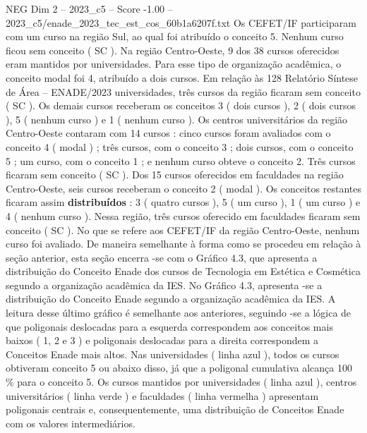 \begin{textsample}{NEG Dim 2 – 2023\_c5 – Score -1.00 – 2023\_c5/enade\_2023\_tec\_est\_cos\_60b1a6207f.txt}
Os CEFET/IF participaram com um curso na região Sul, ao qual foi atribuído o conceito 5.
Nenhum curso ficou sem conceito ( SC ).
Na região Centro-Oeste, 9 dos 38 cursos oferecidos eram mantidos por universidades.
Para esse tipo de organização acadêmica, o conceito modal foi 4, atribuído a dois cursos.
Em relação às 128 Relatório Síntese de Área – ENADE/2023 universidades, três cursos da região ficaram sem conceito ( SC ).
Os demais cursos receberam os conceitos 3 ( dois cursos ), 2 ( dois cursos ), 5 ( nenhum curso ) e 1 ( nenhum curso ).
Os centros universitários da região Centro-Oeste contaram com 14 cursos : cinco cursos foram avaliados com o conceito 4 ( modal ) ; três cursos, com o conceito 3 ; dois cursos, com o conceito 5 ; um curso, com o conceito 1 ; e nenhum curso obteve o conceito 2.
Três cursos ficaram sem conceito ( SC ).
Dos 15 cursos oferecidos em faculdades na região Centro-Oeste, seis cursos receberam o conceito 2 ( modal ).
Os conceitos restantes ficaram assim \textbf{distribuídos} : 3 ( quatro cursos ), 5 ( um curso ), 1 ( um curso ) e 4 ( nenhum curso ).
Nessa região, três cursos oferecido em faculdades ficaram sem conceito ( SC ).
No que se refere aos CEFET/IF da região Centro-Oeste, nenhum curso foi avaliado.
De maneira semelhante à forma como se procedeu em relação à seção anterior, esta seção encerra -se com o Gráfico 4.3, que apresenta a distribuição do Conceito Enade dos cursos de Tecnologia em Estética e Cosmética segundo a organização acadêmica da IES.
No Gráfico 4.3, apresenta -se a distribuição do Conceito Enade segundo a organização acadêmica da IES.
A leitura desse último gráfico é semelhante aos anteriores, seguindo -se a lógica de que poligonais deslocadas para a esquerda correspondem aos conceitos mais baixos ( 1, 2 e 3 ) e poligonais deslocadas para a direita correspondem a Conceitos Enade mais altos.
Nas universidades ( linha azul ), todos os cursos obtiveram conceito 5 ou abaixo disso, já que a poligonal cumulativa alcança 100 \% para o conceito 5.
Os cursos mantidos por universidades ( linha azul ), centros universitários ( linha verde ) e faculdades ( linha vermelha ) apresentam poligonais centrais e, consequentemente, uma distribuição de Conceitos Enade com os valores intermediários.

\end{textsample}
